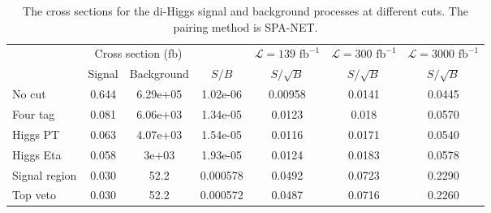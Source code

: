\documentclass[12pt]{article}
\begin{document}
			\begin{table}[htpb]
				\centering
				\caption{The cross sections for the di-Higgs signal and background processes at different cuts. The pairing method is SPA-NET.}
				\label{tab:diHiggs_signal_background_analysis_ATLAS_SPANet}
				\begin{tabular}{l|cc|c|c|c|c}
								  & \multicolumn{2}{c|}{Cross section (fb)} &          & $\mathcal{L} = 139 \text{ fb}^{-1}$ & $\mathcal{L} = 300 \text{ fb}^{-1}$ & $\mathcal{L} = 3000 \text{ fb}^{-1}$ \\
								  & Signal           & Background           & $S / B$  & $S/\sqrt{B}$                        & $S/\sqrt{B}$                        & $S/\sqrt{B}$                         \\ \hline
					No cut        & 0.644            & 6.29e+05             & 1.02e-06 & 0.00958                             & 0.0141                              & 0.0445                               \\
					Four tag      & 0.081            & 6.06e+03             & 1.34e-05 & 0.0123                              & 0.018                               & 0.0570                                \\
					Higgs PT & 0.063            & 4.07e+03             & 1.54e-05 & 0.0116                              & 0.0171                              & 0.0540                               \\
					Higgs Eta & 0.058            & 3e+03                & 1.93e-05 & 0.0124                              & 0.0183                              & 0.0578                               \\
					Signal region  & 0.030            & 52.2                 & 0.000578 & 0.0492                              & 0.0723                              & 0.2290                               \\
					Top veto      & 0.030            & 52.2                 & 0.000572 & 0.0487                              & 0.0716                              & 0.2260                              
				\end{tabular}	
			\end{table}

		



\end{document}
